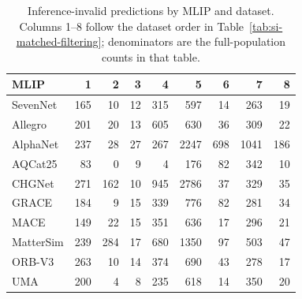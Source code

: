 \begin{table}[ht]
\centering
\caption{Inference-invalid predictions by MLIP and dataset. Columns 1--8 follow the dataset order in Table~\ref{tab:si-matched-filtering}; denominators are the full-population counts in that table.}
\label{tab:si-anomaly-counts}
\small
\begin{tabular}{lrrrrrrrr}
\toprule
MLIP & 1 & 2 & 3 & 4 & 5 & 6 & 7 & 8 \\
\midrule
SevenNet & 165 & 10 & 12 & 315 & 597 & 14 & 263 & 19 \\
Allegro & 201 & 20 & 13 & 605 & 630 & 36 & 309 & 22 \\
AlphaNet & 237 & 28 & 27 & 267 & 2247 & 698 & 1041 & 186 \\
AQCat25 & 83 & 0 & 9 & 4 & 176 & 82 & 342 & 10 \\
CHGNet & 271 & 162 & 10 & 945 & 2786 & 37 & 329 & 35 \\
GRACE & 184 & 9 & 15 & 339 & 776 & 82 & 281 & 34 \\
MACE & 149 & 22 & 15 & 351 & 636 & 17 & 296 & 21 \\
MatterSim & 239 & 284 & 17 & 680 & 1350 & 97 & 503 & 47 \\
ORB-V3 & 263 & 10 & 14 & 374 & 690 & 43 & 278 & 17 \\
UMA & 200 & 4 & 8 & 235 & 618 & 14 & 350 & 20 \\
\bottomrule
\end{tabular}
\end{table}
